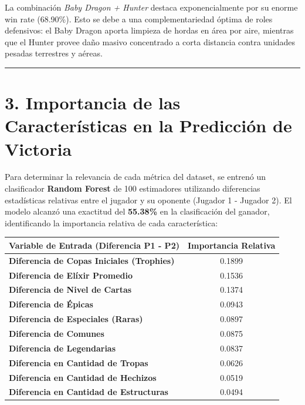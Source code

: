 \documentclass[
  spanish,
  12pt,
]{report}
\newcounter{none} %
\begin{document}
\newpage

La combinación \emph{Baby Dragon + Hunter} destaca exponencialmente por
su enorme win rate (68.90\%). Esto se debe a una complementariedad
óptima de roles defensivos: el Baby Dragon aporta limpieza de hordas en
área por aire, mientras que el Hunter provee daño masivo concentrado a
corta distancia contra unidades pesadas terrestres y aéreas.

\begin{center}\rule{0.5\linewidth}{0.5pt}\end{center}

\section{3. Importancia de las Características en la Predicción de
Victoria}\label{importancia-de-las-caracteruxedsticas-en-la-predicciuxf3n-de-victoria}

Para determinar la relevancia de cada métrica del dataset, se entrenó un
clasificador \textbf{Random Forest} de 100 estimadores utilizando
diferencias estadísticas relativas entre el jugador y su oponente
(Jugador 1 - Jugador 2). El modelo alcanzó una exactitud del
\textbf{55.38\%} en la clasificación del ganador, identificando la
importancia relativa de cada característica:

{\def\LTcaptype{none} %
\begin{longtable}[]{@{}lc@{}}
\toprule\noalign{}
Variable de Entrada (Diferencia P1 - P2) & Importancia Relativa \\
\midrule\noalign{}
\endhead
\bottomrule\noalign{}
\endlastfoot
\textbf{Diferencia de Copas Iniciales (Trophies)} & 0.1899 \\
\textbf{Diferencia de Elíxir Promedio} & 0.1536 \\
\textbf{Diferencia de Nivel de Cartas} & 0.1374 \\
\textbf{Diferencia de Épicas} & 0.0943 \\
\textbf{Diferencia de Especiales (Raras)} & 0.0897 \\
\textbf{Diferencia de Comunes} & 0.0875 \\
\textbf{Diferencia de Legendarias} & 0.0837 \\
\textbf{Diferencia en Cantidad de Tropas} & 0.0626 \\
\textbf{Diferencia en Cantidad de Hechizos} & 0.0519 \\
\textbf{Diferencia en Cantidad de Estructuras} & 0.0494 \\
\end{longtable}
}
\end{document}
